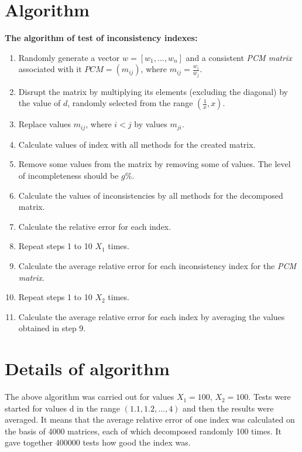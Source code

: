 \section{Algorithm}
\textbf{The algorithm of test of inconsistency indexes:}
\begin{enumerate}
\item Randomly generate a vector $w=[w_{1},...,w_{n}]$ and a consistent \textit{PCM matrix} associated with it $PCM=\left(m_{ij}\right)$, where $m_{ij}=\frac{w_{i}}{w_{j}}$.
\item Disrupt the matrix by multiplying its elements (excluding the diagonal) by the value of $d$, randomly selected from the range $\left(\frac{1}{x},x\right)$.
\item Replace values $m_{ij}$, where $i<j$ by values $m_{ji}$.

\item Calculate values of index with all methods for the created matrix.

\item Remove some values from the matrix by removing some of values. The level of incompleteness should be $g$\%.

\item Calculate the values of inconsistencies by all methods for the decomposed matrix.

\item Calculate the relative error for each index.

\item Repeat steps 1 to 10 $X_{1}$ times.

\item Calculate the average relative error for each inconsistency index for the \textit{PCM matrix}.

\item Repeat steps 1 to 10 $X_{2}$ times.

\item Calculate the average relative error for each index by averaging the values obtained in step 9.

\end{enumerate}


\section{Details of algorithm}
The above algorithm was carried out for values $X_{1}=100$, $X_{2}=100$. Tests were started for values d in the range $\left(1.1,1.2,...,4\right)$ and then the results were averaged. It means that the average relative error of one index was calculated on the basis of 4000 matrices, each of which decomposed randomly 100 times. It gave together 400000 tests how good the index was. 
\\

